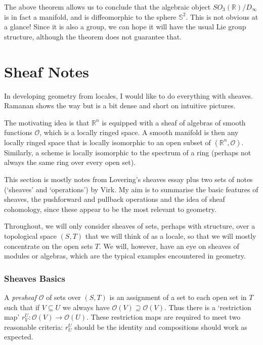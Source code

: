 \documentclass[oneside,english]{amsbook}
\numberwithin{section}{chapter}
\theoremstyle{plain}
\theoremstyle{definition}
\begin{document}
The above theorem allows us to conclude that the algebraic object $SO_3(\mathbb{R})/D_\infty$ is in fact a manifold, and is diffeomorphic to the sphere $\mathbb{S}^2$. This is not obvious at a glance! Since it is also a group, we can hope it will have the usual Lie group structure, although the theorem does not guarantee that.

\chapter{Sheaf Notes}

In developing geometry from locales, I would like to do everything with sheaves. Ramanan shows the way but is a bit dense and short on intuitive pictures. 

The motivating idea is that $\mathbb{R}^n$ is equipped with a sheaf of algebras of smooth functions $\mathscr{O}$, which is a locally ringed space. A smooth manifold is then any locally ringed space that is locally isomorphic to an open subset of $(\mathbb{R}^n, \mathscr{O})$. Similarly, a scheme is locally isomorphic to the spectrum of a ring (perhaps not always the same ring over every open set).

This section is mostly notes from Lovering's sheaves essay plus two sets of notes (`sheaves' and `operations') by Virk. My aim is to summarise the basic features of sheaves, the pushforward and pullback operations and the idea of sheaf cohomology, since these appear to be the most relevant to geometry.

Throughout, we will only consider sheaves of sets, perhaps with structure, over a topological space $(S, T)$ that we will think of as a locale, so that we will mostly concentrate on the open sets $T$. We will, however, have an eye on sheaves of modules or algebras, which are the typical examples encountered in geometry.

\subsection{Sheaves Basics}

A \emph{presheaf} $\mathscr{O}$ of sets over $(S, T)$ is an assignment of a set to each open set in $T$ such that if $V\subseteq U$ we always have $\mathscr{O}(V)\supseteq \mathscr{O}(V)$. Thus there is a `restriction map' $r^U_V:\mathscr{O}(V)\to\mathscr{O}(U)$. These restriction maps are required to meet two reasonable criteria: $r^U_U$ should be the identity and compositions should work as expected.
\end{document}
